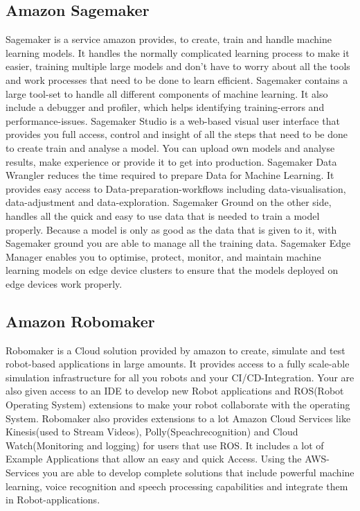 \subsection{Amazon Sagemaker}
Sagemaker is a service amazon provides, to create, train and handle machine learning models. It handles the normally complicated  learning process to make it easier, training multiple large models and don't have to worry about all the tools and work processes that need to be done to learn efficient. Sagemaker contains a large tool-set to handle all different components of machine learning. It also include a debugger and profiler, which helps identifying training-errors and performance-issues.
\newline Sagemaker Studio is a web-based visual user interface that provides you full access, control and insight of all the steps that need to be done to create train and analyse a model. You can upload own models and analyse results, make experience or provide it to get into production. 
\newline Sagemaker Data Wrangler reduces the time required to prepare Data for Machine Learning. It provides easy access to Data-preparation-workflows including data-visualisation, data-adjustment and data-exploration.
\newline Sagemaker Ground on the other side, handles all the quick and easy to use data that is needed to train a model properly. Because a model is only as good as the data that is given to it, with Sagemaker ground you are able to manage all the training data.
\newline Sagemaker Edge Manager enables you to optimise, protect, monitor, and maintain machine learning models on edge device clusters to ensure that the models deployed on edge devices work properly.

\subsection{Amazon Robomaker}
Robomaker is a Cloud solution provided by amazon to create, simulate and test robot-based applications in large amounts. It provides access to a fully scale-able simulation infrastructure for all you robots and your CI/CD-Integration. Your are also given access to an IDE to develop new Robot applications and ROS(Robot Operating System) extensions to make your robot collaborate with the operating System. Robomaker also provides extensions to a lot Amazon Cloud Services like Kinesis(used to Stream Videos), Polly(Speachrecognition) and Cloud Watch(Monitoring and logging) for users that use ROS. It includes a lot of Example Applications that allow an easy and quick Access. Using the AWS-Services you are able to develop complete solutions that include powerful machine learning, voice recognition and speech processing capabilities and integrate them in Robot-applications.

